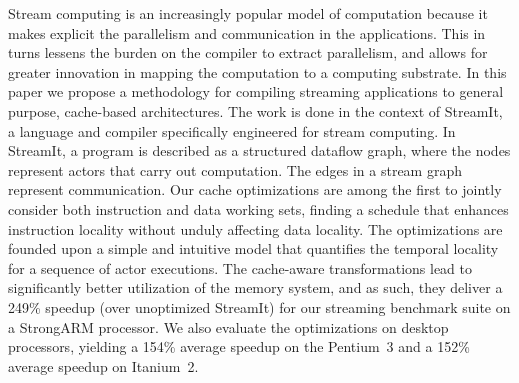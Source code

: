 
Stream computing is an increasingly popular model of computation
because it makes explicit the parallelism and communication in the
applications. This in turns lessens the burden on the compiler to
extract parallelism, and allows for greater innovation in mapping the
computation to a computing substrate. In this paper we propose a
methodology for compiling streaming applications to general purpose,
cache-based architectures. The work is done in the context of
StreamIt, a language and compiler specifically engineered for stream
computing. In StreamIt, a program is described as a structured dataflow
graph, where the nodes represent actors that carry out 
computation. The edges in a stream graph represent
communication. Our cache optimizations are among the first to 
jointly consider both instruction and data working sets, finding 
a schedule that enhances instruction locality without unduly
affecting data locality.  The
optimizations are founded upon a simple and intuitive model that
quantifies the temporal locality for a sequence of  actor
executions.  The cache-aware transformations lead to significantly
better utilization of the memory system, and as such, they deliver
a 249\% speedup (over unoptimized StreamIt) for our streaming benchmark 
suite on a StrongARM processor.  We also evaluate the optimizations on 
desktop processors, yielding a 154\% average speedup on the Pentium~3 
and a 152\% average speedup on Itanium~2.
